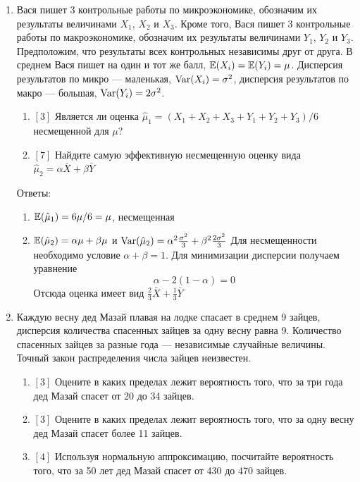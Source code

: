 \documentclass[12pt, a4paper]{article}\usepackage[]{graphicx}\usepackage[]{color}
\begin{document}
\begin{enumerate}
\item Вася пишет 3 контрольные работы по микроэкономике, обозначим их результаты величинами $X_1$, $X_2$ и $X_3$. Кроме того, Вася пишет 3 контрольные работы по макроэкономике, обозначим их результаты величинами $Y_1$, $Y_2$ и $Y_3$. Предположим, что результаты всех контрольных независимы друг от друга. В среднем Вася пишет на один и тот же балл, $\mathbb{E}(X_i)=\mathbb{E}(Y_i)=\mu$. Дисперсия результатов по микро — маленькая, $\operatorname{Var}(X_i)=\sigma^2$, дисперсия результатов по макро — большая, $\operatorname{Var}(Y_i)=2\sigma^2$.
\begin{enumerate}
\item $[3]$ Является ли оценка $\hat{\mu}_1=(X_1+X_2+X_3+Y_1+Y_2+Y_3)/6$ несмещенной для $\mu$?
\item $[7]$ Найдите самую эффективную несмещенную оценку вида $\hat{\mu}_2=\alpha \bar{X}+\beta \bar{Y}$
\end{enumerate}

Ответы:
\begin{enumerate}
\item $\mathbb{E}(\hat{\mu}_1)=6\mu/6=\mu$, несмещенная
\item $\mathbb{E}(\hat{\mu}_2)=\alpha \mu+\beta \mu$ и $\operatorname{Var}(\hat{\mu}_2)=\alpha^2 \frac{\sigma^2}{3}+\beta^2 \frac{2\sigma^2}{3}$
Для несмещенности необходимо условие $\alpha+\beta=1$. Для минимизации дисперсии получаем уравнение
\begin{equation}
\alpha-2(1-\alpha)=0
\end{equation}
Отсюда оценка имеет вид $\frac{2}{3}\bar{X}+\frac{1}{3}\bar{Y}$
\end{enumerate}


\item Каждую весну дед Мазай плавая на лодке спасает в среднем 9 зайцев, дисперсия количества спасенных зайцев за одну весну равна 9. Количество спасенных зайцев за разные года — независимые случайные величины. Точный закон распределения числа зайцев неизвестен.
\begin{enumerate}
\item $[3]$ Оцените в каких пределах лежит вероятность того, что за три года дед Мазай спасет от 20 до 34 зайцев.
\item $[3]$ Оцените в каких пределах лежит вероятность того, что за одну весну дед Мазай спасет более 11 зайцев.
\item $[4]$ Используя нормальную аппроксимацию, посчитайте вероятность того, что за 50 лет дед Мазай спасет от 430 до 470 зайцев.
\end{enumerate}


\end{enumerate}
\end{document}
